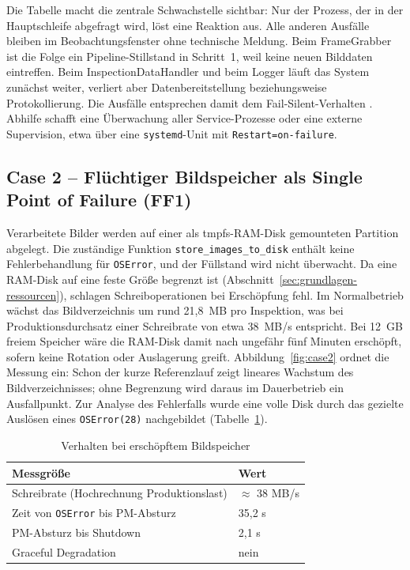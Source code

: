 Die Tabelle macht die zentrale Schwachstelle sichtbar: Nur der Prozess, der in der
Hauptschleife abgefragt wird, löst eine Reaktion aus. Alle anderen Ausfälle bleiben im
Beobachtungsfenster ohne technische Meldung. Beim FrameGrabber ist die Folge ein
Pipeline-Stillstand in Schritt~1, weil keine neuen Bilddaten eintreffen. Beim
InspectionDataHandler und beim Logger läuft das System zunächst weiter, verliert aber
Datenbereitstellung beziehungsweise Protokollierung. Die Ausfälle entsprechen damit dem
Fail-Silent-Verhalten \cite{cristian1991}. Abhilfe schafft eine Überwachung aller
Service-Prozesse oder eine externe Supervision, etwa über eine \texttt{systemd}-Unit mit
\texttt{Restart=on-failure}.

\subsection[Case 2 -- Flüchtiger Bildspeicher als Single Point of Failure]{Case 2 -- Flüchtiger Bildspeicher als Single Point of Failure (FF1)}
\label{sec:case2}

Verarbeitete Bilder werden auf einer als tmpfs-RAM-Disk gemounteten Partition abgelegt.
Die zuständige Funktion \texttt{store\_images\_to\_disk} enthält keine Fehlerbehandlung für
\texttt{OSError}, und der Füllstand wird nicht überwacht. Da eine RAM-Disk auf eine feste
Größe begrenzt ist (Abschnitt~\ref{sec:grundlagen-ressourcen}), schlagen
Schreiboperationen bei Erschöpfung fehl. Im Normalbetrieb wächst das Bildverzeichnis um
rund 21,8~MB pro Inspektion, was bei Produktionsdurchsatz einer Schreibrate von etwa
38~MB/s entspricht. Bei 12~GB freiem Speicher wäre die RAM-Disk damit nach ungefähr fünf
Minuten erschöpft, sofern keine Rotation oder Auslagerung greift. Abbildung~\ref{fig:case2}
ordnet die Messung ein: Schon der kurze Referenzlauf zeigt lineares Wachstum des
Bildverzeichnisses; ohne Begrenzung wird daraus im Dauerbetrieb ein Ausfallpunkt. Zur
Analyse des Fehlerfalls wurde eine volle Disk durch das gezielte Auslösen eines
\texttt{OSError(28)} nachgebildet (Tabelle~\ref{tab:case2}).

\begin{table}[htbp]
    \centering
    \caption{Verhalten bei erschöpftem Bildspeicher}
    \label{tab:case2}
    \begin{tabularx}{\textwidth}{lX}
        \hline
        \textbf{Messgröße} & \textbf{Wert} \\
        \hline
        Schreibrate (Hochrechnung Produktionslast) & $\approx$ 38 MB/s \\
        Zeit von \texttt{OSError} bis PM-Absturz   & 35,2 s \\
        PM-Absturz bis Shutdown                    & 2,1 s \\
        Graceful Degradation                       & nein \\
        \hline
    \end{tabularx}
\end{table}

